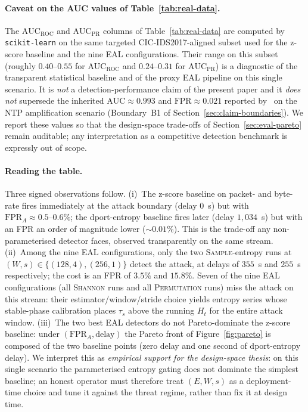 \documentclass[futureinternet,article,submit,pdftex,moreauthors]{Definitions/mdpi}
\newcommand{\taus}{\ensuremath{\tau_{s}}}
\begin{document}
\paragraph{Caveat on the AUC values of Table~\ref{tab:real-data}.} The
$\text{AUC}_{\text{ROC}}$ and $\text{AUC}_{\text{PR}}$ columns of
Table~\ref{tab:real-data} are computed by \texttt{scikit-learn} on the
same targeted CIC-IDS2017-aligned subset used for the z-score baseline
and the nine EAL configurations. Their range on this subset (roughly
$0.40$--$0.55$ for $\text{AUC}_{\text{ROC}}$ and $0.24$--$0.31$ for
$\text{AUC}_{\text{PR}}$) is a diagnostic of the transparent statistical
baseline and of the proxy EAL pipeline on this single scenario. It is
\emph{not} a detection-performance claim of the present paper and it
\emph{does not} supersede the inherited $\text{AUC} \approx 0.993$ and
$\text{FPR} \approx 0.021$ reported by~\cite{paper3} on the NTP
amplification scenario (Boundary~B1 of
Section~\ref{sec:claim-boundaries}). We report these values so that the
design-space trade-offs of Section~\ref{sec:eval-pareto} remain
auditable; any interpretation as a competitive detection benchmark is
expressly out of scope.

\paragraph{Reading the table.} Three signed observations follow.
(i)~The z-score baseline on packet- and byte-rate fires immediately at
the attack boundary (delay $0$~s) but with $\text{FPR}_{\!A} \approx
0.5\text{--}0.6\%$; the dport-entropy baseline fires later
(delay $1{,}034$~s) but with an FPR an order of magnitude lower
($\sim$$0.01\%$). This is the trade-off any non-parameterised detector
faces, observed transparently on the same stream.
(ii)~Among the nine EAL configurations, only the two
\textsc{Sample}-entropy runs at $(W,s) \in \{(128,4), (256,1)\}$ detect
the attack, at delays of $355$~s and $255$~s respectively; the cost is
an FPR of $3.5\%$ and $15.8\%$. Seven of the nine EAL configurations
(all \textsc{Shannon} runs and all \textsc{Permutation} runs) miss the
attack on this stream: their estimator/window/stride choice yields
entropy series whose stable-phase calibration places $\taus$ above the
running $H_t$ for the entire attack window.
(iii)~The two best EAL detectors do not Pareto-dominate the z-score
baseline: under $(\text{FPR}_{\!A}, \text{delay})$ the Pareto front of
Figure~\ref{fig:pareto} is composed of the two baseline points (zero
delay and one second of dport-entropy delay).
We interpret this as \emph{empirical support for the design-space
thesis}: on this single scenario the parameterised entropy gating does
not dominate the simplest baseline; an honest operator must therefore
treat $(E, W, s)$ as a deployment-time choice and tune it against the
threat regime, rather than fix it at design time.
\end{document}
